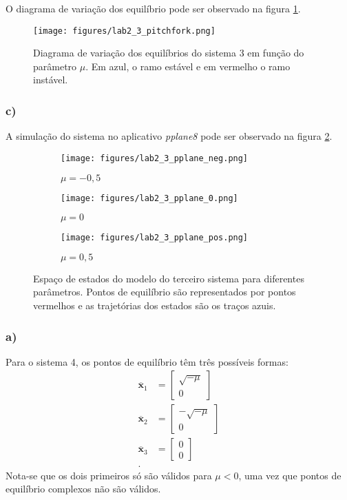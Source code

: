 \documentclass[a4paper]{report}
\begin{document}
O diagrama de variação dos equilíbrio pode ser observado na figura \ref{fig:figures-lab2_3_pitchfork-png}.

\begin{figure}[H]
    \centering
    \texttt{[image: figures/lab2\_3\_pitchfork.png]}
    \caption{Diagrama de variação dos equilíbrios do sistema 3 em função do parâmetro $\mu$. Em azul, o ramo estável e em vermelho o ramo instável.}
    \label{fig:figures-lab2_3_pitchfork-png}
\end{figure}

\subsubsection*{c)}

A simulação do sistema no aplicativo \emph{pplane8} pode ser observado na figura \ref{fig:pplane-3}.

\begin{figure}[H]
    \centering
    \begin{subfigure}{0.29\textwidth}
	\texttt{[image: figures/lab2\_3\_pplane\_neg.png]}
	\caption{$\mu=-0,5$}
    \end{subfigure}
    \begin{subfigure}{0.29\textwidth}
	\texttt{[image: figures/lab2\_3\_pplane\_0.png]}
	\caption{$\mu=0$}
    \end{subfigure}
    \begin{subfigure}{0.29\textwidth}
	\texttt{[image: figures/lab2\_3\_pplane\_pos.png]}
	\caption{$\mu=0,5$}
    \end{subfigure}
    \caption{Espaço de estados do modelo do terceiro sistema para diferentes parâmetros. Pontos de equilíbrio são representados por pontos vermelhos e as trajetórias dos estados são os traços azuis.}
    \label{fig:pplane-3}
\end{figure}

\exercise{}

\subsubsection*{a)}

Para o sistema 4, os pontos de equilíbrio têm três possíveis formas:
\begin{align*}
    \bm{\overline{x}}_1 &= \begin{bmatrix} \sqrt{-\mu} \\ 0 \end{bmatrix} \\
    \bm{\overline{x}}_2 &= \begin{bmatrix} -\sqrt{-\mu} \\ 0 \end{bmatrix} \\
    \bm{\overline{x}}_3 &= \begin{bmatrix} 0 \\ 0 \end{bmatrix} \\
.\end{align*}
Nota-se que os dois primeiros só são válidos para $\mu<0$, uma vez que pontos de equilíbrio complexos não são válidos.
\end{document}
